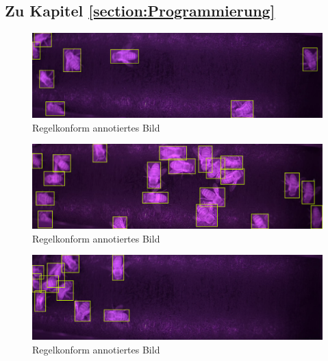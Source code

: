 \documentclass[11pt,a4paper]{article}
\begin{document}
\subsection{Zu Kapitel \autoref{section:Programmierung}}
\begin{figure}[!htb] \label{annotated1}
    \centering
	    \includegraphics[width = .8\textwidth]{images/annotated1.png}
        \caption{Regelkonform annotiertes Bild}
\end{figure}

\begin{figure}[!htb] \label{annotated2}
    \centering
	    \includegraphics[width = .8\textwidth]{images/annotated2.png}
        \caption{Regelkonform annotiertes Bild}
\end{figure}

\begin{figure}[!htb] \label{annotated3}
    \centering
	    \includegraphics[width = .8\textwidth]{images/annotated3.png}
        \caption{Regelkonform annotiertes Bild}
\end{figure}
\newpage
\end{document}

